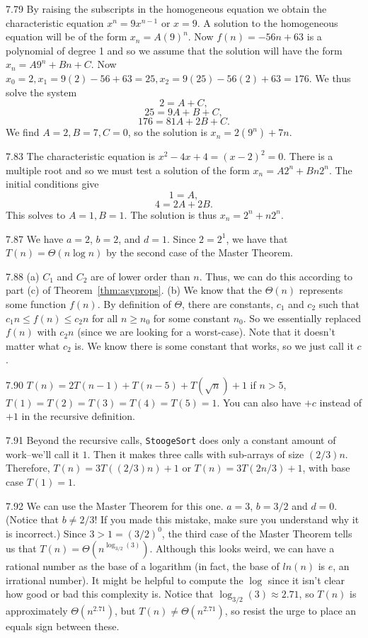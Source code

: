 \begin{Answer}{7.79}
By raising the subscripts in the homogeneous equation we
obtain the characteristic equation $x^n = 9x^{n - 1}$ or $x = 9$.
A solution to the homogeneous equation will be of the form $x_n =
A(9)^n$. Now $f(n) = -56n + 63$ is a polynomial of degree 1 and so
we assume that the solution will have the form $x_n = A9^n + Bn + C$.
Now $x_0 = 2,
x_1 = 9(2) - 56 + 63 = 25, x_2 = 9(25) - 56(2) + 63 = 176$. We
thus solve the system
$$2 = A + C,$$
$$25 = 9A + B + C,$$
$$176 = 81A + 2B + C.$$
We find $A = 2, B = 7, C = 0$, so the solution is $x_n = 2(9^n) + 7n.$
\end{Answer}
\begin{Answer}{7.83}
The characteristic equation is $x^2 - 4x + 4 = (x - 2)^2
= 0$. There is a multiple root and so we must test a solution of
the form $x_n = A2^n + Bn2^n.$ The initial conditions give
$$1 = A,$$
$$4 = 2A + 2B.$$
This solves to $A = 1, B = 1.$ The solution is thus $x_n = 2^n + n2^n$.
\end{Answer}
\begin{Answer}{7.87}
We have $a=2$, $b=2$, and $d=1$. Since $2=2^1$, we have that
$T(n)=\Theta(n\log n)$ by the second case of the Master Theorem.
\end{Answer}
\begin{Answer}{7.88}
(a) $C_1$ and $C_2$ are of lower order than $n$.
Thus, we can do this according to part (c) of Theorem~\ref{thm:asyprops}.
(b) We know that the $\Theta(n)$ represents some function $f(n)$.  By definition of $\Theta$,
there are constants, $c_1$ and $c_2$ such that $c_1n\leq f(n)\leq c_2n$ for all $n\geq n_0$
for some constant $n_0$.  So we essentially replaced $f(n)$ with $c_2n$ (since we are
looking for a worst-case).
Note that it doesn't matter what $c_2$ is.
We know there is some constant that works, so we just call it $c$.
\end{Answer}
\begin{Answer}{7.90}
$T(n)=2 T(n-1)+T(n-5)+T(\sqrt{n})+1$ if $n>5$,
$T(1)=T(2)=T(3)=T(4)=T(5)=1$.
You can also have $+c$ instead of $+1$ in the recursive definition.
\end{Answer}
\begin{Answer}{7.91}
Beyond the recursive calls, \verb+StoogeSort+ does only a constant amount of work--we'll call it $1$.
Then it makes three calls with sub-arrays of size $(2/3)n$.  Therefore,
$T(n)=3T((2/3)n)+1$ or $T(n)=3T(2n/3)+1$, with base case $T(1)=1$.
\end{Answer}
\begin{Answer}{7.92}
We can use the Master Theorem for this one.
$a=3$, $b=3/2$ and $d=0$.
(Notice that $b\neq 2/3$!  If you made this mistake, make sure you understand why it is incorrect.)
Since $3>1=(3/2)^0$, the third case of the Master Theorem tells us that
$T(n)=\Theta\left(n^{\log_{3/2}(3)}\right)$.  Although this looks weird, we can have a rational number as
the base of a logarithm (in fact, the base of $ln(n)$ is $e$, an irrational number).
It might be helpful to compute the $\log$ since it isn't clear how good or bad this complexity is.
Notice that $\log_{3/2}(3)\approx 2.71$, so $T(n)$ is approximately $\Theta(n^{2.71})$, but
$T(n)\neq \Theta(n^{2.71})$, so resist the urge to place an equals sign between these.
\end{Answer}

